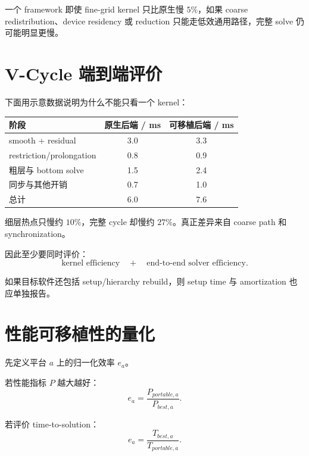 一个 framework 即使 fine-grid kernel 只比原生慢 $5\%$，如果 coarse redistribution、device residency 或 reduction 只能走低效通用路径，完整 solve 仍可能明显更慢。

\section{V-Cycle 端到端评价}

下面用示意数据说明为什么不能只看一个 kernel：

\begin{center}
\begin{tabular}{lcc}
\toprule
阶段 & 原生后端 / ms & 可移植后端 / ms\\
\midrule
smooth + residual & 3.0 & 3.3\\
restriction/prolongation & 0.8 & 0.9\\
粗层与 bottom solve & 1.5 & 2.4\\
同步与其他开销 & 0.7 & 1.0\\
\midrule
总计 & 6.0 & 7.6\\
\bottomrule
\end{tabular}
\end{center}

细层热点只慢约 $10\%$，完整 cycle 却慢约 $27\%$。真正差异来自 coarse path 和 synchronization。

因此至少要同时评价：
\begin{equation}
\boxed{
\text{kernel efficiency}
\quad+\quad
\text{end-to-end solver efficiency}.
}
\end{equation}

如果目标软件还包括 setup/hierarchy rebuild，则 setup time 与 amortization 也应单独报告。

\section{性能可移植性的量化}

先定义平台 $a$ 上的归一化效率 $e_a$。

若性能指标 $P$ 越大越好：
\begin{equation}
e_a
=
\frac{P_{portable,a}}
{P_{best,a}}.
\label{eq:portability-platform-efficiency-throughput}
\end{equation}

若评价 time-to-solution：
\begin{equation}
e_a
=
\frac{T_{best,a}}
{T_{portable,a}}.
\label{eq:portability-platform-efficiency-time}
\end{equation}

